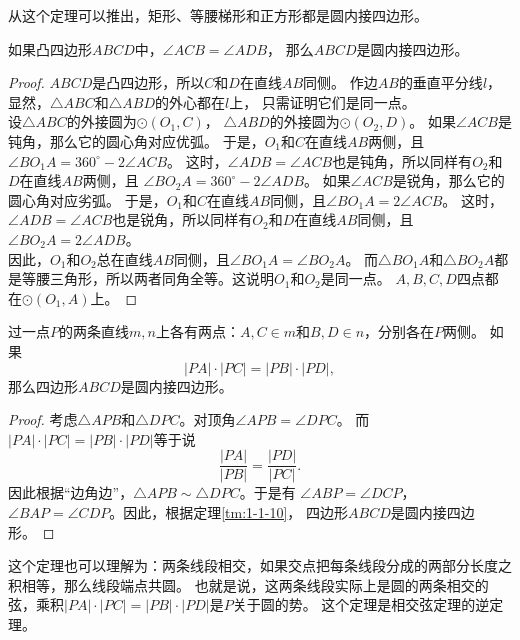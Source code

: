 \documentclass[12pt,UTF8]{ctexbook}
\begin{document}
从这个定理可以推出，矩形、等腰梯形和正方形都是圆内接四边形。

\begin{tm}\label{tm:1-1-10}
    如果凸四边形$ABCD$中，$\angle ACB = \angle ADB$，
    那么$ABCD$是圆内接四边形。
\end{tm}

\begin{proof}
    $ABCD$是凸四边形，所以$C$和$D$在直线$AB$同侧。
    作边$AB$的垂直平分线$l$，显然，$\triangle ABC$和$\triangle ABD$的外心都在$l$上，
    只需证明它们是同一点。\\
    设$\triangle ABC$的外接圆为$\odot{(O_1, C)}$，
    $\triangle ABD$的外接圆为$\odot{(O_2, D)}$。
    如果$\angle ACB$是钝角，那么它的圆心角对应优弧。
    于是，$O_1$和$C$在直线$AB$两侧，且$\angle BO_1A = 360^\circ - 2\angle ACB$。
    这时，$\angle ADB = \angle ACB$也是钝角，所以同样有$O_2$和$D$在直线$AB$两侧，且
    $\angle BO_2A = 360^\circ - 2\angle ADB$。
    如果$\angle ACB$是锐角，那么它的圆心角对应劣弧。
    于是，$O_1$和$C$在直线$AB$同侧，且$\angle BO_1A = 2\angle ACB$。
    这时，$\angle ADB = \angle ACB$也是锐角，所以同样有$O_2$和$D$在直线$AB$同侧，且
    $\angle BO_2A = 2\angle ADB$。\\
    因此，$O_1$和$O_2$总在直线$AB$同侧，且$\angle BO_1A = \angle BO_2A$。
    而$\triangle BO_1A$和$\triangle BO_2A$都是等腰三角形，所以两者同角全等。这说明$O_1$和$O_2$是同一点。
    $A,B,C,D$四点都在$\odot{(O_1, A)}$上。
\end{proof}

\begin{tm}\label{tm:1-1-20}
    过一点$P$的两条直线$m,n$上各有两点：$A, C\in m$和$B, D \in n$，分别各在$P$两侧。
    如果
    $$ |PA| \cdot |PC| = |PB| \cdot |PD|, $$
    那么四边形$ABCD$是圆内接四边形。
\end{tm}

\begin{proof}
    考虑$\triangle APB$和$\triangle DPC$。对顶角$\angle APB = \angle DPC$。
    而$ |PA| \cdot |PC| = |PB| \cdot |PD|$等于说
    $$ \frac{|PA|}{|PB|} = \frac{|PD|}{|PC|}.$$
    因此根据“边角边”，$\triangle APB \sim \triangle DPC$。于是有
    $\angle ABP = \angle DCP$，$\angle BAP = \angle CDP$。因此，根据定理\ref{tm:1-1-10}，
    四边形$ABCD$是圆内接四边形。
\end{proof}
这个定理也可以理解为：两条线段相交，如果交点把每条线段分成的两部分长度之积相等，那么线段端点共圆。
也就是说，这两条线段实际上是圆的两条相交的弦，乘积$ |PA| \cdot |PC| = |PB| \cdot |PD|$是$P$关于圆的势。
这个定理是相交弦定理的逆定理。
\end{document}
